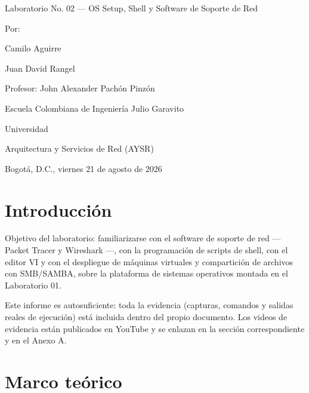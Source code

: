 \begin{titlepage}
  \centering
  \vspace*{1cm}

  {\large Laboratorio No. 02 --- OS Setup, Shell y Software de Soporte de Red \par}
  \vspace{1.5cm}

  {\large Por: \par}
  {\large Camilo Aguirre \par}
  {\large Juan David Rangel \par}
  \vspace{1cm}

  {\large Profesor: John Alexander Pachón Pinzón \par}
  \vspace{1.5cm}

  {\large Escuela Colombiana de Ingeniería Julio Garavito \par}
  {\large Universidad \par}
  \vspace{0.5cm}

  {\large Arquitectura y Servicios de Red (AYSR) \par}
  \vspace{1.5cm}

  {\large Bogotá, D.C., viernes 21 de agosto de 2026 \par}

  \vfill
\end{titlepage}

\tableofcontents
\newpage

\section{Introducción}

Objetivo del laboratorio: familiarizarse con el software de soporte de red --- Packet Tracer y Wireshark ---, con la programación de scripts de shell, con el editor VI y con el despliegue de máquinas virtuales y compartición de archivos con SMB/SAMBA, sobre la plataforma de sistemas operativos montada en el Laboratorio 01.

Este informe es autosuficiente: toda la evidencia (capturas, comandos y salidas reales de ejecución) está incluida dentro del propio documento. Los videos de evidencia están publicados en YouTube y se enlazan en la sección correspondiente y en el Anexo A.

\section{Marco teórico}

